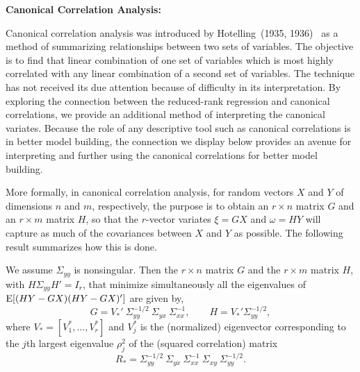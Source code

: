 \noindent \textbf{Canonical Correlation Analysis:} \label{in:cancor1} \twomedskip


\noindent Canonical correlation analysis was introduced by Hotelling~(1935, 1936)~\cite{hotelling35,hotelling36} as a method of summarizing relationships between two sets of variables. The objective is to find that linear combination of one set of variables which is most highly correlated with any linear combination of a second set of variables. The technique has not received its due attention because of difficulty in its interpretation. By exploring the connection between the reduced-rank regression and canonical correlations, we provide an additional method of interpreting the canonical variates. Because the role of any descriptive tool such as canonical correlations is in better model building, the connection we display below provides an avenue for interpreting and further using the canonical correlations for better model building.


More formally, in canonical correlation analysis, for random vectors $X$ and $Y$ of dimensions $n$ and $m$, respectively, the purpose is to obtain an $r \times n$ matrix $G$ and an $r \times m$ matrix $H$, so that the $r$-vector variates $\xi= GX$ and $\omega= HY$ will capture as much of the covariances between $X$ and $Y$ as possible. The following result summarizes how this is done.


\begin{result} \label{res:4} 
We assume $\Sigma_{yy}$ is nonsingular. Then the $r \times n$ matrix $G$ and the $r \times m$ matrix $H$, with $H \Sigma_{yy}H'= I_r$, that minimize simultaneously all the eigenvalues of $\operatorname{E}[(HY-GX)(HY-GX)']$ are given by,
	\begin{equation}
	G= V_*'\  \Sigma_{yy}^{-1/2}\ \Sigma_{yx}\ \Sigma_{xx}^{-1}, \qquad H= V_*'  \Sigma_{yy}^{-1/2},
	\end{equation}
where $V_*= [V_1^*, \ldots, V_r^*]$ and $V_j^*$ is the (normalized) eigenvector corresponding to the $j$th largest eigenvalue $\rho_j^2$ of the (squared correlation) matrix
	\begin{equation} \label{eqn:eigenlargestmatrix}
	R_*= \Sigma_{yy}^{-1/2}\ \Sigma_{yx}\ \Sigma_{xx}^{-1}\ \Sigma_{xy}\ \Sigma_{yy}^{-1/2}.
	\end{equation}
\end{result}


